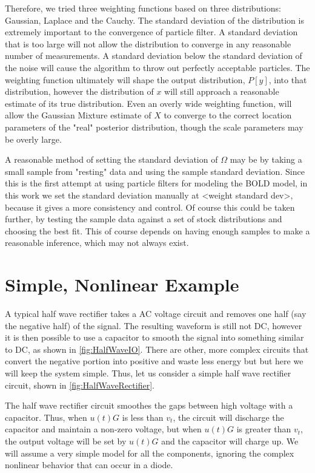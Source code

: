 Therefore, we tried three weighting functions based on three distributions: Gaussian, 
Laplace and the Cauchy. The standard deviation of the distribution is extremely
important to the convergence of particle filter. A standard deviation that is 
too large will not allow the distribution to converge in any reasonable number of 
measurements. A standard deviation below the standard deviation of the noise 
will cause the algorithm to throw out perfectly acceptable particles. 
The weighting function ultimately will shape the output distribution, $P[y]$, into that
distribution, however the distribution of $x$ will still approach a reasonable
estimate of its true distribution. Even an overly wide weighting function, will
allow the Gaussian Mixture estimate of $X$ to converge to the correct location 
parameters of the "real" posterior distribution, though the scale parameters may 
be overly large.

A reasonable method of setting the standard deviation of $\Omega$ may be by 
taking a small sample from "resting" data and using the sample standard deviation.
Since this is the first attempt at using particle filters for modeling the 
BOLD model, in this work we set the standard deviation manually at <weight standard dev>,
because it gives a more consistency and control. Of course this could be taken
further, by testing the sample data against a set of stock distributions
and choosing the best fit. This of course depends on having enough samples
to make a reasonable inference, which may not always exist. 

\section{Simple, Nonlinear Example}
A typical half wave rectifier takes a AC voltage circuit and removes
one half (say the negative half) of the signal. The resulting waveform
is still not DC, however it is then possible to use a capacitor to 
smooth the signal into something similar to DC, as shown in \autoref{fig:HalfWaveIO}.
There are other, more
complex circuits that convert the negative portion into positive and
waste less energy but but here we will keep the system simple.
Thus, let us consider a simple half wave rectifier circuit, shown in 
\autoref{fig:HalfWaveRectifier}.

The half wave rectifier circuit smoothes the gaps between high voltage
with a capacitor. Thus, when $u(t)G$ is less than $v_t$, the circuit will 
discharge the capacitor and maintain a non-zero voltage,
but when $u(t)G$ is greater than $v_t$, the output voltage will be set
by $u(t)G$ and the capacitor will charge up. We will assume a very simple
model for all the components, ignoring the complex nonlinear behavior
that can occur in a diode. 


